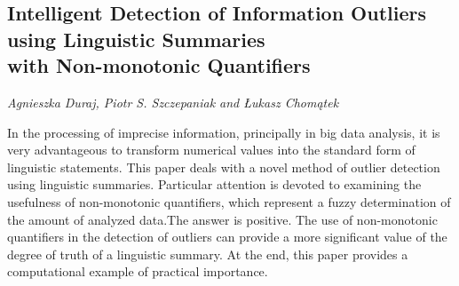 \documentclass[../booklet.tex]{subfiles}
\begin{document}
\subsection[Intelligent Detection of Information Outliers using Linguistic Summaries \\with Non-monotonic Quantifiers. {\it Agnieszka Duraj, Piotr S. Szczepaniak and Łukasz Chomątek}]{Intelligent Detection of Information Outliers using Linguistic Summaries \\with Non-monotonic Quantifiers}
  

\begin{center}
  {\it Agnieszka Duraj, Piotr S. Szczepaniak and Łukasz Chomątek}
\end{center}



In the processing of imprecise information, principally in big data analysis, it is very advantageous to transform numerical values into the standard form of linguistic statements. 
This paper deals with a novel method of outlier detection using linguistic summaries. Particular attention is devoted to examining the usefulness of non-monotonic quantifiers, which represent a fuzzy determination of the amount of analyzed data.The answer is positive. The use of non-monotonic quantifiers in the detection of outliers can provide a more significant value of the degree of truth of a linguistic summary. At the end, this paper provides a computational example of practical importance.

\end{document}
